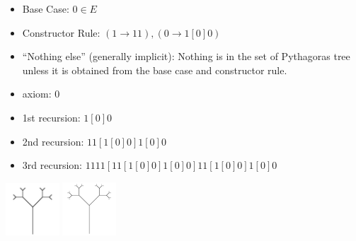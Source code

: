 \documentclass[solution, letterpaper]{cs20inclass}
\begin{document}
\begin{solution}
\subsolution
\begin{itemize}
\item Base Case:  $0\in E$
\item Constructor Rule:  $(1\rightarrow 11), (0\rightarrow 1[0]0)$
\item “Nothing else” (generally implicit): Nothing is in the set of Pythagoras tree unless it is obtained from the base case and constructor rule.
\end{itemize}
\subsolution 
\begin{itemize}
\item axiom:	0
\item 1st recursion:	$1[0]0$
\item 2nd recursion: $11[1[0]0]1[0]0$
\item 3rd recursion:	$1111[11[1[0]0]1[0]0]11[1[0]0]1[0]0$
\end{itemize}
\subsolution
\includegraphics[width=2cm]{3} 
\includegraphics[width=2cm]{4}
\end{solution}
\end{document}
